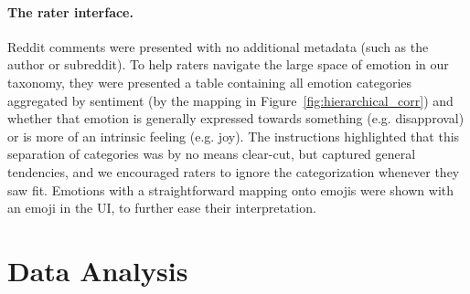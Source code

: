 \documentclass[11pt,a4paper]{article}
\begin{document}
\paragraph{The rater interface.} 
Reddit comments were presented with no additional metadata (such as the author or subreddit). To help raters navigate the large space of emotion in our taxonomy, they were presented a table containing all emotion categories aggregated by sentiment (by the mapping in Figure~\ref{fig:hierarchical_corr}) and whether that emotion is generally expressed towards something (e.g. disapproval) or is more of an intrinsic feeling (e.g. joy). The instructions highlighted that this separation of categories was by no means clear-cut, but captured general tendencies, and we encouraged raters to ignore the categorization whenever they saw fit. Emotions with a straightforward mapping onto emojis were shown with an emoji in the UI, to further ease their interpretation.

 \section{Data Analysis} \label{sec:data_analysis}
\end{document}
